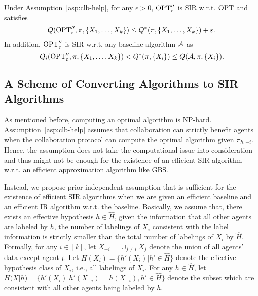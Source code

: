 \begin{corollary}
    Under Assumption~\ref{asp:clb-help}, for any $\epsilon>0$, $\textrm{OPT}_\varepsilon''$ is SIR w.r.t. $\textrm{OPT}$ and satisfies $$Q(\textrm{OPT}''_\varepsilon, \pi, \{X_1,\ldots,X_k\})\leq Q^*(\pi, \{X_1,\ldots,X_k\}) +\varepsilon.$$
    In addition, $\textrm{OPT}_\varepsilon''$ is SIR w.r.t. any baseline algorithm $\mathcal{A}$ as $$Q_i(\textrm{OPT}''_\varepsilon, \pi, \{X_1,\ldots,X_k\})< Q^*(\pi, \{X_i\}) \leq Q(\mathcal{A},\pi,\{X_i\}).$$
\end{corollary}



\subsection{A Scheme of Converting Algorithms to SIR Algorithms
}\label{subsec:sir-apprx}
\vspace{-0.5em}
As mentioned before, computing an optimal algorithm is NP-hard. Assumption~\ref{asp:clb-help} assumes that collaboration can strictly benefit agents when the collaboration protocol can compute the optimal algorithm given $\pi_{h,-i}$.
Hence, the assumption does not take the computational issue into consideration and thus might not be enough for the existence of an efficient SIR algorithm w.r.t. an efficient approximation algorithm like GBS.

Instead, we propose prior-independent assumption that is sufficient for the existence of efficient SIR algorithms when we are given an efficient baseline and an efficient IR algorithm w.r.t. the baseline. 
Basically, we assume that, there exists an effective hypothesis $h\in \hat H$, given the information that all other agents are labeled by $h$, the number of labelings of $X_i$ consistent with the label information is strictly smaller than the total number of labelings of $X_i$ by $\hat H$. Formally, for any $i\in [k]$, let $X_{-i} = \cup_{j\neq i} X_j$ denote the union of all agents' data except agent $i$.
Let $H(X_i)=\{h'(X_i)|h'\in \hat H\}$ denote the effective hypothesis class of $X_i$, i.e., all labelings of $X_i$.
For any $h\in \hat H$, let $H(X|h) = \{h'(X_i)|h'(X_{-i}) = h(X_{-i}),h'\in \hat H\}$ denote the subset which are consistent with all other agents being labeled by $h$.

